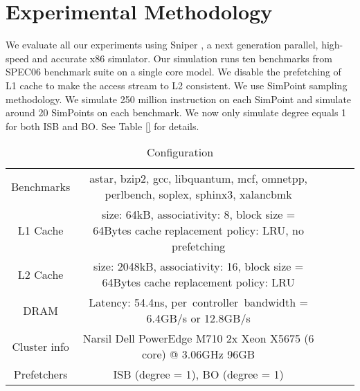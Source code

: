 \section{Experimental Methodology}
\label{sec:methodology}

We evaluate all our experiments using Sniper \cite{sniperpaper}, a next generation parallel, high-speed and accurate x86 simulator. Our simulation runs ten benchmarks from SPEC06 benchmark suite on a single core model. We disable the prefetching of L1 cache to make the access stream to L2 consistent. We use SimPoint sampling methodology. We simulate 250 million instruction on each SimPoint and simulate around 20 SimPoints on each benchmark. We now only simulate degree equals 1 for both ISB and BO. See Table \ref{} for details. 


\begin{table}[ht!]
\centering
\begin{tabular}{cccll}
\cline{1-3}
\multicolumn{1}{|c|}{Benchmarks}                     & \multicolumn{1}{c|}{astar, bzip2, gcc, libquantum, mcf, omnetpp, perlbench, soplex, sphinx3, xalancbmk}                       &  \\ \cline{1-2}

\multicolumn{1}{|c|}{L1 Cache}                     & \multicolumn{1}{c|}{size: 64kB, associativity: 8, block size = 64Bytes cache replacement policy: LRU, no prefetching}                       &  \\ \cline{1-2}

\multicolumn{1}{|c|}{L2 Cache}                     & \multicolumn{1}{c|}{size: 2048kB, associativity: 16, block size = 64Bytes cache replacement policy: LRU}                       &  \\ \cline{1-2}

\multicolumn{1}{|c|}{DRAM}                     & \multicolumn{1}{c|}{Latency: 54.4ns, per\ controller\ bandwidth = 6.4GB/s or 12.8GB/s}                       &  \\ \cline{1-2}

\multicolumn{1}{|c|}{Cluster info}                     & \multicolumn{1}{c|}{Narsil 	Dell PowerEdge M710	
2x Xeon X5675 (6 core) @ 3.06GHz 	96GB}                       &  \\ \cline{1-2}

\multicolumn{1}{|c|}{Prefetchers}                     & \multicolumn{1}{c|}{ISB (degree = 1), BO (degree = 1)}                       &  \\ \cline{1-2}

\end{tabular}
\caption{Configuration}
\label{table:config}
\end{table}

